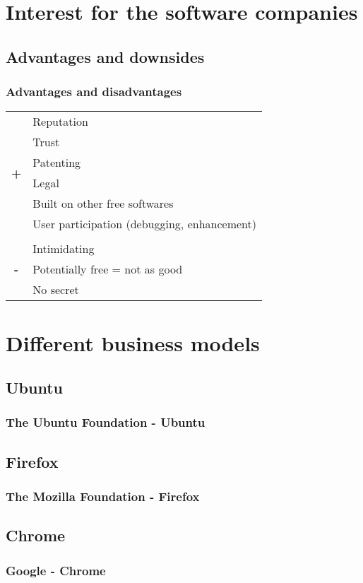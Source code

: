 \documentclass{beamer}
\begin{document}
\section{Interest for the software companies}

\subsection{Advantages and downsides}

\begin{frame}

  \frametitle{Advantages and disadvantages}

  \begin{tabular}{cl}

    \multirow{6}{*}{\Huge{\textbf{+}}} & Reputation \\
    & Trust \\
    & Patenting \\
    & Legal \\
    & Built on other free softwares \\
    & User participation (debugging, enhancement) \\

    & \\

    \multirow{3}{*}{\Huge{\textbf{-}}} & Intimidating \\
    & Potentially free = not as good \\
    & No secret

  \end{tabular}

\end{frame}

\section{Different business models}

\subsection{Ubuntu}

\begin{frame}

  \frametitle{The Ubuntu Foundation - Ubuntu}

\end{frame}

\subsection{Firefox}

\begin{frame}

  \frametitle{The Mozilla Foundation - Firefox}

\end{frame}

\subsection{Chrome}

\begin{frame}

  \frametitle{Google - Chrome}

\end{frame}
\end{document}
